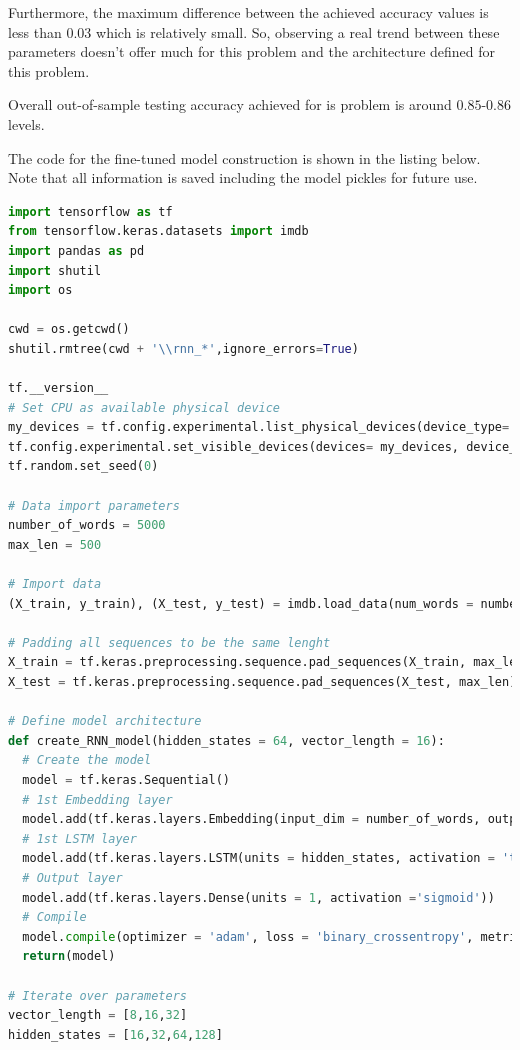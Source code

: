 \documentclass[11pt]{article}
\begin{document}
Furthermore, the maximum difference between the achieved accuracy values is less than 0.03 which is relatively small. So, observing a real trend between these parameters doesn't offer much for this problem and the architecture defined for this problem. \medskip

Overall out-of-sample testing accuracy achieved for is problem is around $\bm{0.85}$-$\bm{0.86}$ levels. 

The code for the fine-tuned model construction is shown in the listing below. Note that all information is saved including the model pickles for future use.

\begin{lstlisting}[language=Python, basicstyle=\tiny, caption=Python code for the fine-tuned LSTM model]
import tensorflow as tf
from tensorflow.keras.datasets import imdb
import pandas as pd
import shutil
import os

cwd = os.getcwd()
shutil.rmtree(cwd + '\\rnn_*',ignore_errors=True)

tf.__version__
# Set CPU as available physical device
my_devices = tf.config.experimental.list_physical_devices(device_type='CPU')
tf.config.experimental.set_visible_devices(devices= my_devices, device_type='CPU')
tf.random.set_seed(0)

# Data import parameters
number_of_words = 5000
max_len = 500

# Import data
(X_train, y_train), (X_test, y_test) = imdb.load_data(num_words = number_of_words)

# Padding all sequences to be the same lenght
X_train = tf.keras.preprocessing.sequence.pad_sequences(X_train, max_len)
X_test = tf.keras.preprocessing.sequence.pad_sequences(X_test, max_len)

# Define model architecture
def create_RNN_model(hidden_states = 64, vector_length = 16):
  # Create the model
  model = tf.keras.Sequential()
  # 1st Embedding layer
  model.add(tf.keras.layers.Embedding(input_dim = number_of_words, output_dim = vector_length, input_shape = (X_train.shape[1],)))
  # 1st LSTM layer
  model.add(tf.keras.layers.LSTM(units = hidden_states, activation = 'tanh'))
  # Output layer
  model.add(tf.keras.layers.Dense(units = 1, activation ='sigmoid'))
  # Compile
  model.compile(optimizer = 'adam', loss = 'binary_crossentropy', metrics=['binary_accuracy'])
  return(model)

# Iterate over parameters
vector_length = [8,16,32]
hidden_states = [16,32,64,128]


\end{lstlisting}
\end{document}
